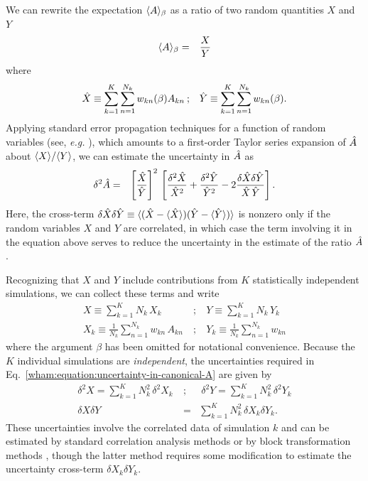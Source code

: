 We can rewrite the expectation $\langle A \rangle_\beta$ as a ratio of two random quantities $X$ and $Y$
\begin{eqnarray}
\langle A \rangle_\beta &=& \frac{X}{Y} 
\end{eqnarray}
where
\begin{eqnarray}
\hat{X} \equiv \sum_{k=1}^K \sum_{n=1}^{N_k} w_{kn}(\beta) A_{kn} \: &;& \hat{Y} \equiv \sum_{k=1}^K \sum_{n=1}^{N_k} w_{kn}(\beta) .
\end{eqnarray}
Applying standard error propagation techniques for a function of random variables (see, \emph{e.g.} \cite{taylor-error-propagation}), which amounts to a first-order Taylor series expansion of $\hat{A}$ about $\langle X \rangle/\langle Y \rangle$, we can estimate the uncertainty in $\hat{A}$ as
\begin{eqnarray}
\delta^2 \hat{A} &=& \left[\frac{\hat{X}}{\hat{Y}}\right]^2 \, \left[ \frac{\delta^2 \hat{X}}{\hat{X}^2} + \frac{\delta^2 \hat{Y}}{\hat{Y}^2} - 2 \frac{\delta \hat{X} \delta \hat{Y}}{\hat{X} \,\hat{Y}} \right] \label{wham:equation:uncertainty-in-canonical-A}. 
\end{eqnarray}
Here, the cross-term $\delta \hat{X} \delta \hat{Y} \equiv \langle (\hat{X}-\langle \hat{X} \rangle) (\hat{Y} - \langle \hat{Y} \rangle) \rangle$ is nonzero only if the random variables $X$ and $Y$ are correlated, in which case the term involving it in the equation above serves to reduce the uncertainty in the estimate of the ratio $\hat{A}$. 

Recognizing that $X$ and $Y$ include contributions from $K$ statistically independent simulations, we can collect these terms and write
\begin{eqnarray}
X \equiv \sum\limits_{k=1}^K N_k \, X_k \: &;& \: Y \equiv \sum\limits_{k=1}^K N_k \, Y_k \nonumber \\
X_k \equiv \frac{1}{N_k} \sum_{n=1}^{N_k} w_{kn} \, A_{kn} \: &;& \: Y_k \equiv \frac{1}{N_k} \sum_{n=1}^{N_k} w_{kn} 
\end{eqnarray}
where the argument $\beta$ has been omitted for notational convenience.  Because the $K$ individual simulations are \emph{independent}, the uncertainties required in Eq.\ \ref{wham:equation:uncertainty-in-canonical-A} are given by
\begin{eqnarray}
\delta^2 X = \sum_{k=1}^K N_k^2 \, \delta^2 X_k \: &;& \: \delta^2 Y = \sum_{k=1}^K N_k^2 \, \delta^2 Y_k \nonumber \\
\delta X \delta Y &=& \sum_{k=1}^K N_k^2 \, \delta X_k \delta Y_k .
\end{eqnarray}
These uncertainties involve the correlated data of simulation $k$ and can be estimated by standard correlation analysis methods \cite{swope:1982a,janke:2002a} or by block transformation methods \cite{flyvbjerg:1989a}, though the latter method requires some modification to estimate the uncertainty cross-term $\delta X_k \delta Y_k$.

